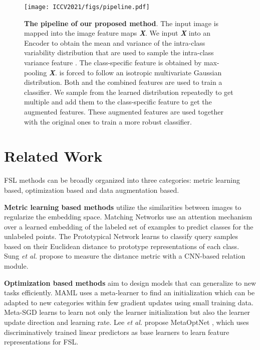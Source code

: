 \documentclass[10pt,twocolumn,letterpaper]{article}
\begin{document}
\begin{figure*}[!t]
  \centering
  \texttt{[image: ICCV2021/figs/pipeline.pdf]}\\
   \caption{\textbf{The pipeline of our proposed method}. The input image is mapped into the image feature maps \textbf{\textit{X}}. We input \textbf{\textit{X}} into an Encoder to obtain the mean and variance of the intra-class variability distribution that are used to sample the intra-class variance feature . The class-specific feature  is obtained by max-pooling \textbf{\textit{X}}.  is forced to follow an isotropic multivariate Gaussian distribution. Both  and the combined features are used to train a classifier.
We sample from the learned distribution repeatedly to get multiple  and add them to the class-specific feature  to get the augmented features.
These augmented features are used together with the original ones to train a more robust classifier.
  }
  \label{fig:pipeline}
\end{figure*}
\section{Related Work}

FSL methods can be broadly organized into three categories: metric learning based, optimization based and data augmentation based.
      
      \textbf{Metric learning based methods} \cite{matchingnet,protonet,relationnet,Ye2020FewShotLV,Yang2021FreeLF,Tian2020RethinkingFI,Zhang2020DeepEMDFI} utilize the similarities between images to regularize the embedding space. Matching Networks \cite{matchingnet} use an attention mechanism over a learned embedding of the labeled set of examples to predict classes for the unlabeled points.
The Prototypical Network \cite{protonet} learns to classify query samples based on their Euclidean distance to prototype representations of each class.
Sung \textit{et al.} \cite{relationnet} propose to measure the distance metric with a CNN-based relation module.


      \textbf{Optimization based methods} \cite{maml,metasgd,meta-opt,Lifchitz2019DenseCA,Santoro2016MetaLearningWM,Rajeswaran2019MetaLearningWI,Scott2018AdaptedDE} aim to design models that can generalize to new tasks efficiently.
MAML \cite{maml} uses a meta-learner to find an initialization which can be adapted to new categories within few gradient updates using small training data. 
Meta-SGD \cite{metasgd} learns to learn not only the learner initialization but also the learner update direction and learning rate.
Lee \textit{et al.} propose MetaOptNet \cite{meta-opt}, which uses discriminatively trained linear predictors as base learners to learn feature representations for FSL.
\end{document}
